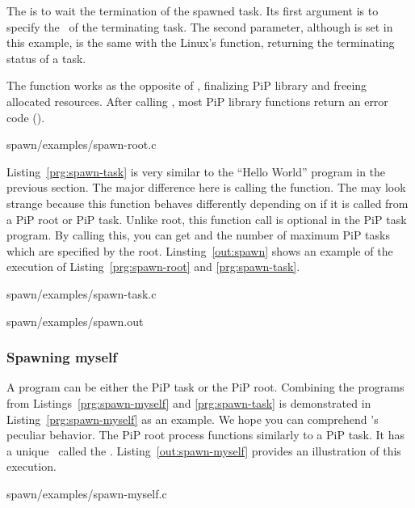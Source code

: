 The  is to wait the termination of the spawned
task. Its first argument is to specify the \PIPID\ of the terminating
task. The second parameter, although {\NULL} is set in this example,
is the same with the Linux's  function, returning
the terminating status of a task.

The  function works as the opposite of
, finalizing PiP library and freeing allocated 
resources. After calling , most PiP library
functions return an error code ().

 {spawn/examples/spawn-root.c}

Listing~\ref{prg:spawn-task} is very similar to the ``Hello World''
program in the previous section. The major difference here is calling
the  function.
The  may
look strange because this function behaves differently depending
on if it is called from a PiP root or PiP task.
Unlike root, this function call is
optional in the PiP task program. By calling this, you can get 
{\PIPID} and the number of maximum PiP tasks which are specified by the
root. Linsting~\ref{out:spawn} shows an example of the execution of
Listing~\ref{prg:spawn-root} and \ref{prg:spawn-task}. 


                {spawn/examples/spawn-task.c}


                {spawn/examples/spawn.out}

\subsubsection{Spawning myself}

A program can be either the PiP task or the PiP root. Combining the
programs from Listings~\ref{prg:spawn-myself} and \ref{prg:spawn-task}
is demonstrated in Listing~\ref{prg:spawn-myself} as 
an example. We hope you can comprehend 's peculiar
behavior. The PiP root process functions similarly to a PiP task. It
has a unique \PIPID\ called the
. Listing~\ref{out:spawn-myself} provides an 
illustration of this execution. 


                {spawn/examples/spawn-myself.c}

